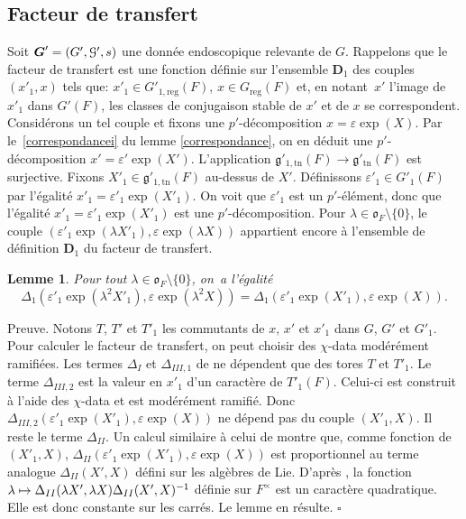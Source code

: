 \documentclass[11pt]{article}
\numberwithin{equation}{section}\providecommand{\og}{«\,}\providecommand{\fg}{\,»}
\let\mathcal \EuScript
\let\epsilon\varepsilon
\newcommand\mto{\mathchoice{\longmapsto}{\mapsto}{\mapsto}{\mapsto}}
\newcommand{\frg}{\mathfrak{g}}
\newcommand{\fro}{\mathfrak{o}}
\newcommand{\reg}{\mathrm{reg}}
\newcommand{\tn}{\mathrm{tn}}
\newcommand{\bD}{\boldsymbol{D}}
\newcommand{\bG}{\boldsymbol{G}}
\newcommand{\cG}{\mathcal{G}}
\theoremstyle{plain}
\newtheorem*{lem*}{Lemme}
\theoremstyle{definition}
\begin{document}
\subsection{Facteur de transfert}\label{facteurdetransfert}
Soit $\bG'=(G',\cG',s)$ une donnée endoscopique relevante de $G$. Rappelons que le facteur de transfert est une fonction définie sur l'ensemble $\bD_{1}$ des couples $(x'_{1},x)$ tels que: $x'_{1}\in G'_{1,\reg}(F)$, $x\in G_{\reg}(F)$ et, en notant~$x'$ l'image de $x'_{1}$ dans $G'(F)$, les classes de conjugaison stable de $x'$ et de $x$ se correspondent. Considérons un tel couple et fixons une
$p'$-décomposition $x=\epsilon \exp(X)$. Par le~\eqref{correspondancei} du
lemme \ref{correspondance}, on en déduit une $p'$-décomposition $x'=\epsilon' \exp(X')$. L'application $\frg'_{1,\tn}(F)\to \frg'_{\tn}(F)$ est surjective. Fixons $X'_{1}\in \frg'_{1,\tn}(F)$ au-dessus de $X'$. Définissons $\epsilon'_{1}\in G'_{1}(F)$ par l'égalité $x'_{1}=\epsilon'_{1}\exp(X'_{1})$. On voit que $\epsilon'_{1}$ est un $p'$-élément, donc que l'égalité $x'_{1}=\epsilon'_{1}\exp(X'_{1})$ est une $p'$-décomposition. Pour $\lambda\in \fro_{F}\setminus\{0\}$, le couple $(\epsilon'_{1}\exp(\lambda X'_{1}),\epsilon \exp(\lambda X))$ appartient encore à l'ensemble de définition $\bD_{1}$ du facteur de transfert.

\begin{lem*}
Pour tout $\lambda\in \fro_{F}\setminus\{0\}$, on~a l'égalité
\[
\Delta_{1}(\epsilon'_{1}\exp(\lambda^2 X'_{1}),\epsilon \exp(\lambda^2 X))=\Delta_{1}(\epsilon'_{1}\exp( X'_{1}),\epsilon \exp( X)).
\]
\end{lem*}

Preuve. Notons $T$, $T'$ et $T'_{1}$ les commutants de $x$, $x'$ et $x'_{1}$ dans $G$, $G'$ et $G'_{1}$. Pour calculer le facteur de transfert, on peut choisir des $\chi$-data modérément ramifiées. Les termes $\Delta_{I}$ et $\Delta_{\textit{III},1}$ de \cite{LS} ne dépendent que des tores $T$ et $T'_{1}$. Le terme $\Delta_{\textit{III},2}$ est la valeur en $x'_{1}$ d'un caractère de $T'_{1}(F)$. Celui-ci est construit à l'aide des $\chi$\nobreakdash-data et est modérément ramifié. Donc $\Delta_{\textit{III},2}(\epsilon'_{1}\exp( X'_{1}),\epsilon \exp( X))$ ne dépend pas du couple $(X'_{1},X)$. Il reste le terme $\Delta_{\textit{II}}$. Un calcul similaire à celui de \cite[Lem.\, 10.3]{W4} montre que, comme fonction de $(X'_{1},X)$, $\Delta_{\textit{II}}(\epsilon'_{1}\exp( X'_{1}),\epsilon \exp( X))$ est proportionnel au terme analogue $\Delta_{\textit{II}}(X',X)$ défini sur les algèbres de Lie. D'après \cite[Lem.\,3.2.1]{F}, la fonction $\lambda\mto \Delta_{\textit{II}}(\lambda X',\lambda X)\Delta_{\textit{II}}(X',X)^{-1}$ définie sur $F^{\times}$ est un caractère quadratique. Elle est donc constante sur les carrés. Le lemme en résulte. $\square$
\end{document}
